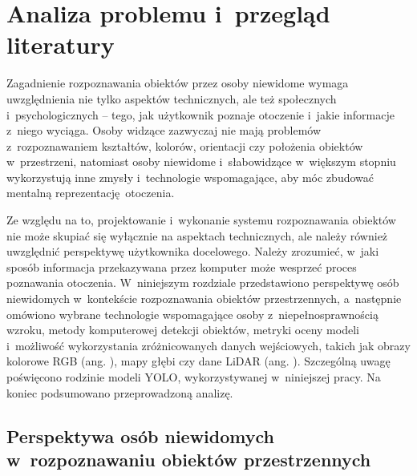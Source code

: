 \chapter{Analiza problemu i~przegląd literatury}  %
\label{c:analiza}

Zagadnienie rozpoznawania obiektów przez osoby niewidome wymaga uwzględnienia nie tylko aspektów technicznych, ale też społecznych i~psychologicznych -- tego, jak użytkownik poznaje otoczenie i~jakie informacje z~niego wyciąga. Osoby widzące zazwyczaj nie mają problemów z~rozpoznawaniem kształtów, kolorów, orientacji czy położenia obiektów w~przestrzeni, natomiast osoby niewidome i~słabowidzące w~większym stopniu wykorzystują inne zmysły i~technologie wspomagające, aby móc zbudować mentalną reprezentację~otoczenia.

Ze względu na to, projektowanie i~wykonanie systemu rozpoznawania obiektów nie może skupiać się wyłącznie na aspektach technicznych, ale należy również uwzględnić perspektywę użytkownika docelowego. Należy zrozumieć, w~jaki sposób informacja przekazywana przez komputer może wesprzeć proces poznawania otoczenia. W~niniejszym rozdziale przedstawiono perspektywę osób niewidomych w~kontekście rozpoznawania obiektów przestrzennych, a~następnie omówiono wybrane technologie wspomagające osoby z~niepełnosprawnością wzroku, metody komputerowej detekcji obiektów, metryki oceny modeli i~możliwość wykorzystania zróżnicowanych danych wejściowych, takich jak obrazy kolorowe RGB (ang. ), mapy głębi czy dane LiDAR (ang. ). Szczególną uwagę poświęcono rodzinie modeli YOLO, wykorzystywanej w~niniejszej pracy. Na koniec podsumowano przeprowadzoną analizę.

\section{Perspektywa osób niewidomych w~rozpoznawaniu obiektów przestrzennych}
\label{s:perspektywa}

